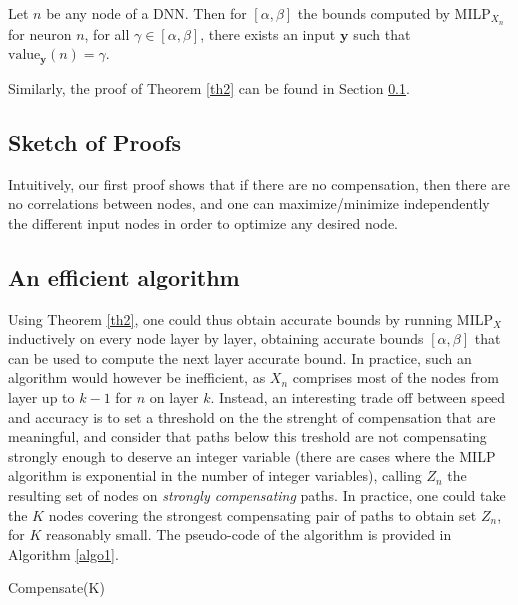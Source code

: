 \documentclass{llncs}
\newcommand{\vy}{\boldsymbol{y}}
\newcommand{\val}{{\textrm{value}}}
\begin{document}
\begin{theorem}
	\label{th2} 
	Let $n$ be any node of a DNN. Then for $[\alpha,\beta]$ the bounds computed by MILP$_{X_n}$ for neuron $n$, for all $\gamma \in [\alpha,\beta]$, there exists an input $\vy$ such that $\val_{\vy}(n)=\gamma$.
\end{theorem}

Similarly, the proof of Theorem \ref{th2} can be found in Section \ref{sec.proofs}.


\subsection{Sketch of Proofs}
\label{sec.proofs}

Intuitively, our first proof shows that if there are no compensation, then there are no correlations between nodes, and one can maximize/minimize independently the different input nodes in order to optimize any desired node.




\subsection{An efficient algorithm}

Using Theorem \ref{th2}, one could thus obtain accurate bounds by running MILP$_{X}$ inductively on every node layer by layer, obtaining accurate bounds $[\alpha,\beta]$ that can be used to compute the next layer accurate bound. In practice, such an algorithm would however be inefficient, as $X_n$ comprises most of the nodes from layer up to $k-1$ for $n$ on layer $k$. Instead, an interesting trade off between speed and accuracy is to set a threshold on the the strenght of compensation that are meaningful, and consider that paths below this treshold are not compensating strongly enough to deserve an integer variable (there are cases where the MILP algorithm is exponential in the number of integer variables), calling $Z_n$ the resulting set of nodes on {\em strongly compensating} paths. In practice, one could take the $K$ nodes covering the strongest compensating pair of paths to obtain set $Z_n$, for $K$ reasonably small. 
The pseudo-code of the algorithm is provided in Algorithm \ref{algo1}.

	
\begin{algorithm}[t!]
	\caption{Compensate(K)}
	\label{algo1}
	
	 
	 \end{algorithm}	
	
\end{document}

